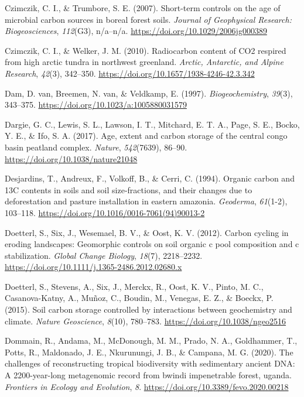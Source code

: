 \documentclass[]{article}
\begin{document}
\leavevmode\hypertarget{ref-Czimczik_2007}{}%
Czimczik, C. I., \& Trumbore, S. E. (2007). Short-term controls on the
age of microbial carbon sources in boreal forest soils. \emph{Journal of
Geophysical Research: Biogeosciences}, \emph{112}(G3), n/a--n/a.
\url{https://doi.org/10.1029/2006jg000389}

\leavevmode\hypertarget{ref-Czimczik_2010}{}%
Czimczik, C. I., \& Welker, J. M. (2010). Radiocarbon content of CO2
respired from high arctic tundra in northwest greenland. \emph{Arctic,
Antarctic, and Alpine Research}, \emph{42}(3), 342--350.
\url{https://doi.org/10.1657/1938-4246-42.3.342}

\leavevmode\hypertarget{ref-van_Dam_1997}{}%
Dam, D. van, Breemen, N. van, \& Veldkamp, E. (1997).
\emph{Biogeochemistry}, \emph{39}(3), 343--375.
\url{https://doi.org/10.1023/a:1005880031579}

\leavevmode\hypertarget{ref-Dargie_2017}{}%
Dargie, G. C., Lewis, S. L., Lawson, I. T., Mitchard, E. T. A., Page, S.
E., Bocko, Y. E., \& Ifo, S. A. (2017). Age, extent and carbon storage
of the central congo basin peatland complex. \emph{Nature},
\emph{542}(7639), 86--90. \url{https://doi.org/10.1038/nature21048}

\leavevmode\hypertarget{ref-Desjardins_1994}{}%
Desjardins, T., Andreux, F., Volkoff, B., \& Cerri, C. (1994). Organic
carbon and 13C contents in soils and soil size-fractions, and their
changes due to deforestation and pasture installation in eastern
amazonia. \emph{Geoderma}, \emph{61}(1-2), 103--118.
\url{https://doi.org/10.1016/0016-7061(94)90013-2}

\leavevmode\hypertarget{ref-Doetterl_2012}{}%
Doetterl, S., Six, J., Wesemael, B. V., \& Oost, K. V. (2012). Carbon
cycling in eroding landscapes: Geomorphic controls on soil organic c
pool composition and c stabilization. \emph{Global Change Biology},
\emph{18}(7), 2218--2232.
\url{https://doi.org/10.1111/j.1365-2486.2012.02680.x}

\leavevmode\hypertarget{ref-Doetterl_2015}{}%
Doetterl, S., Stevens, A., Six, J., Merckx, R., Oost, K. V., Pinto, M.
C., Casanova-Katny, A., Muñoz, C., Boudin, M., Venegas, E. Z., \&
Boeckx, P. (2015). Soil carbon storage controlled by interactions
between geochemistry and climate. \emph{Nature Geoscience},
\emph{8}(10), 780--783. \url{https://doi.org/10.1038/ngeo2516}

\leavevmode\hypertarget{ref-Dommain_2020}{}%
Dommain, R., Andama, M., McDonough, M. M., Prado, N. A., Goldhammer, T.,
Potts, R., Maldonado, J. E., Nkurunungi, J. B., \& Campana, M. G.
(2020). The challenges of reconstructing tropical biodiversity with
sedimentary ancient DNA: A 2200-year-long metagenomic record from bwindi
impenetrable forest, uganda. \emph{Frontiers in Ecology and Evolution},
\emph{8}. \url{https://doi.org/10.3389/fevo.2020.00218}
\end{document}
